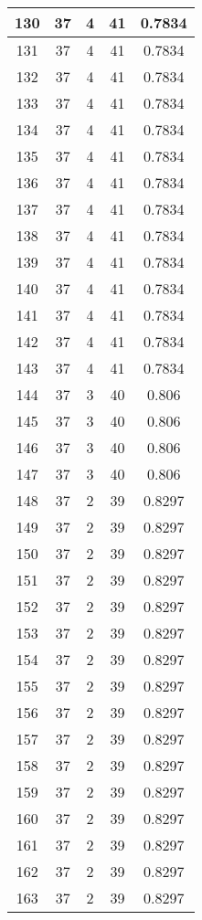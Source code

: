 \documentclass[letterpaper, 12pt]{article}
\begin{document}
\begin{longtable}{|c|c|c|c|c|}
\hline
130 & 37 & 4 & 41 & 0.7834 \\
\hline
131 & 37 & 4 & 41 & 0.7834 \\
\hline
132 & 37 & 4 & 41 & 0.7834 \\
\hline
133 & 37 & 4 & 41 & 0.7834 \\
\hline
134 & 37 & 4 & 41 & 0.7834 \\
\hline
135 & 37 & 4 & 41 & 0.7834 \\
\hline
136 & 37 & 4 & 41 & 0.7834 \\
\hline
137 & 37 & 4 & 41 & 0.7834 \\
\hline
138 & 37 & 4 & 41 & 0.7834 \\
\hline
139 & 37 & 4 & 41 & 0.7834 \\
\hline
140 & 37 & 4 & 41 & 0.7834 \\
\hline
141 & 37 & 4 & 41 & 0.7834 \\
\hline
142 & 37 & 4 & 41 & 0.7834 \\
\hline
143 & 37 & 4 & 41 & 0.7834 \\
\hline
144 & 37 & 3 & 40 & 0.806 \\
\hline
145 & 37 & 3 & 40 & 0.806 \\
\hline
146 & 37 & 3 & 40 & 0.806 \\
\hline
147 & 37 & 3 & 40 & 0.806 \\
\hline
148 & 37 & 2 & 39 & 0.8297 \\
\hline
149 & 37 & 2 & 39 & 0.8297 \\
\hline
150 & 37 & 2 & 39 & 0.8297 \\
\hline
151 & 37 & 2 & 39 & 0.8297 \\
\hline
152 & 37 & 2 & 39 & 0.8297 \\
\hline
153 & 37 & 2 & 39 & 0.8297 \\
\hline
154 & 37 & 2 & 39 & 0.8297 \\
\hline
155 & 37 & 2 & 39 & 0.8297 \\
\hline
156 & 37 & 2 & 39 & 0.8297 \\
\hline
157 & 37 & 2 & 39 & 0.8297 \\
\hline
158 & 37 & 2 & 39 & 0.8297 \\
\hline
159 & 37 & 2 & 39 & 0.8297 \\
\hline
160 & 37 & 2 & 39 & 0.8297 \\
\hline
161 & 37 & 2 & 39 & 0.8297 \\
\hline
162 & 37 & 2 & 39 & 0.8297 \\
\hline
163 & 37 & 2 & 39 & 0.8297 \\

\end{longtable}
\end{document}
